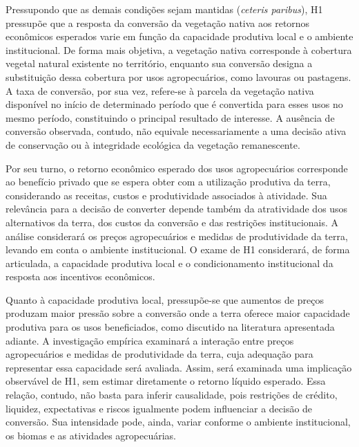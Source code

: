 
Pressupondo que as demais condições sejam mantidas (\textit{ceteris paribus}), H1 pressupõe que a resposta da conversão da vegetação nativa aos retornos econômicos esperados varie em função da capacidade produtiva local e o ambiente institucional. De forma mais objetiva, a vegetação nativa corresponde à cobertura vegetal natural existente no território, enquanto sua conversão designa a substituição dessa cobertura por usos agropecuários, como lavouras ou pastagens. A taxa de conversão, por sua vez, refere-se à parcela da vegetação nativa disponível no início de determinado período que é convertida para esses usos no mesmo período, constituindo o principal resultado de interesse. A ausência de conversão observada, contudo, não equivale necessariamente a uma decisão ativa de conservação ou à integridade ecológica da vegetação remanescente. 

Por seu turno, o retorno econômico esperado dos usos agropecuários corresponde ao benefício privado que se espera obter com a utilização produtiva da terra, considerando as receitas, custos e produtividade associados à atividade. Sua relevância para a decisão de converter depende também da atratividade dos usos alternativos da terra, dos custos da conversão e das restrições institucionais. A análise considerará os preços agropecuários e medidas de produtividade da terra, levando em conta o ambiente institucional. O exame de H1 considerará, de forma articulada, a capacidade produtiva local e o condicionamento institucional da resposta aos incentivos econômicos.

Quanto à capacidade produtiva local, pressupõe-se que aumentos de preços produzam maior pressão sobre a conversão onde a terra oferece maior capacidade produtiva para os usos beneficiados, como discutido na literatura apresentada adiante. A investigação empírica examinará a interação entre preços agropecuários e medidas de produtividade da terra, cuja adequação para representar essa capacidade será avaliada. Assim, será examinada uma implicação observável de H1, sem estimar diretamente o retorno líquido esperado. Essa relação, contudo, não basta para inferir causalidade, pois restrições de crédito, liquidez, expectativas e riscos igualmente podem influenciar a decisão de conversão. Sua intensidade pode, ainda, variar conforme o ambiente institucional, os biomas e as atividades agropecuárias.

